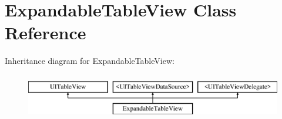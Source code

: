 \hypertarget{interface_expandable_table_view}{\section{Expandable\-Table\-View Class Reference}
\label{interface_expandable_table_view}
}
Inheritance diagram for Expandable\-Table\-View\-:\begin{figure}[H]
\begin{center}
\leavevmode
\includegraphics[height=2.000000cm]{interface_expandable_table_view}
\end{center}
\end{figure}
